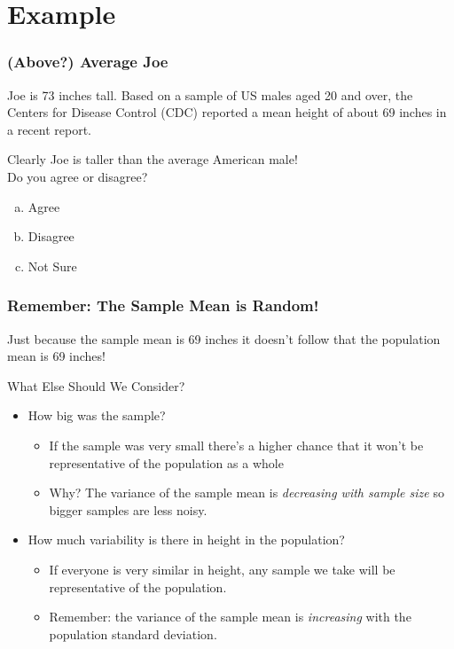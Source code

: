 \documentclass{beamer}
\begin{document}
\section{Example}
\begin{frame}
\frametitle{(Above?) Average Joe }

Joe is 73 inches tall. Based on a sample of US males aged 20 and over, the Centers for Disease Control (CDC) reported a mean height of about 69 inches in a recent report.

\alert{Clearly Joe is taller than the average American male!}\\
Do you agree or disagree?
\begin{enumerate}[(a)]
	\item Agree
	\item Disagree
	\item Not Sure
\end{enumerate}
\end{frame}

\begin{frame}
\frametitle{Remember: The Sample Mean is Random!}

\alert{Just because the sample mean is 69 inches it doesn't follow that the population mean is 69 inches!}

\begin{block}{What Else Should We Consider?}
	\begin{itemize}\pause
		\item How big was the sample? \pause
			\begin{itemize}
				\item If the sample was very small there's a higher chance that it won't be representative of the population as a whole \pause
				\item Why? The variance of the sample mean is \emph{decreasing with sample size} so bigger samples are less noisy. \pause
			\end{itemize}
		\item How much variability is there in height in the population?	\pause
			\begin{itemize}
				\item If everyone is very similar in height, any sample we take will be representative of the population. \pause
				\item Remember: the variance of the sample mean is \emph{increasing} with the population standard deviation. 
			\end{itemize}
	\end{itemize}
\end{block}

\end{frame}
\end{document}
